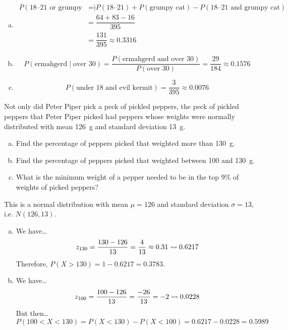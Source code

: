 \documentclass[12pt,letterpaper]{exam}
\begin{document}
\begin{questions}
\begin{enumerate}[(a)]
\item 
	\[
	\begin{aligned}
	P(\text{18--21 or grumpy cat})&= P(\text{18--21}) + P(\text{grumpy cat}) - P(\text{18--21 and grumpy cat}) \\
	&= \dfrac{64 + 83 - 16}{395} \\
	&= \dfrac{131}{395} \approx 0.3316
	\end{aligned}
	\] 

\item 
	\[
	P(\text{ermahgerd} \;|\; \text{over 30})= \dfrac{P(\text{ermahgerd and over 30})}{P(\text{over 30})}= \dfrac{29}{184} \approx 0.1576
	\] 

\item 
	\[
	P(\text{under 18 and evil kermit})= \dfrac{3}{395} \approx 0.0076
	\]
\end{enumerate}



\newpage
\question[15] Not only did Peter Piper pick a peck of pickled peppers, the peck of pickled peppers that Peter Piper picked had peppers whose weights were normally distributed with mean 126~g and standard deviation 13~g. 
	\begin{enumerate}[(a)]
	\item Find the percentage of peppers picked that weighted more than 130~g. 
	\item Find the percentage of peppers picked that weighted between 100 and 130~g. 
	\item What is the minimum weight of a pepper needed to be in the top 9\% of weights of picked peppers?
	\end{enumerate} \pspace

\sol This is a normal distribution with mean $\mu= 126$ and standard deviation $\sigma= 13$, i.e. $N(126, 13)$. 

\begin{enumerate}[(a)]
\item We have\dots
	\[
	z_{130}= \dfrac{130 - 126}{13} = \dfrac{4}{13} \approx 0.31 \rightsquigarrow 0.6217
	\]
Therefore, $P(X > 130)= 1 - 0.6217= 0.3783$. \pspace

\item We have\dots
	\[
	z_{100}= \dfrac{100 - 126}{13}= \dfrac{-26}{13}= -2 \rightsquigarrow 0.0228
	\]
But then\dots
	\[
	P(100 < X < 130)= P(X < 130) - P(X < 100)= 0.6217 - 0.0228= 0.5989
	\] \pspace
	

\end{enumerate}
\end{questions}
\end{document}
